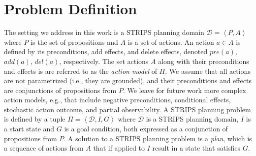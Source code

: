 \documentclass[letterpaper]{article}
\newcommand{\tuple}[1]{\ensuremath{\left \langle #1 \right \rangle }}
\begin{document}



\section{Problem Definition}
The setting we address in this work is 
a STRIPS planning domain $\mathcal{D}=\tuple{P,A}$ 
where $P$ is the set of propositions and $A$ is a set of actions. 
An action $a\in A$ is defined by its preconditions, add effects, and delete effects, denoted $pre(a)$, $add(a)$, $del(a)$, respectively. The set actions $A$ along with their preconditions and effects is are referred to as the {\em action model} of $\Pi$. We assume that all actions are not parametrized (i.e., they are grounded), and their preconditions and effects are conjunctions of propositions from $P$. 
We leave for future work more complex action models, e.g., that include negative preconditions, conditional effects, stochastic action outcome, and partial observability. A STRIPS planning problem  is defined by a tuple $\Pi=\tuple{\mathcal{D}, I, G}$ where $\mathcal{D}$ is a STRIPS planning domain, $I$ is a start state and $G$ is a goal condition, both expressed as a conjunction of propositions from $P$. A solution to a STRIPS planning problem is a {\em plan}, which is a sequence of actions from $A$ that if applied to $I$ result in a state that satisfies $G$. %
\end{document}

